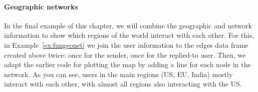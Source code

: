 \paragraph{Geographic networks}
In the final example of this chapter, we will combine the geographic and network information to
show which regions of the world interact with each other.
For this, in Example~\ref{ex:fungeonet} we join the user information to the edges data frame created above twice:
once for the sender, once for the replied-to user.
Then, we adapt the earlier code for plotting the map by adding a line for each node in the network.
As you can see, users in the main regions (US, EU, India) mostly interact with each other,
with almost all regions also interacting with the US.


